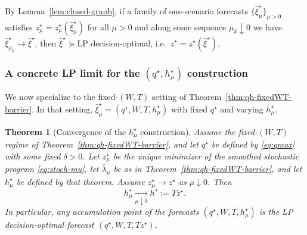 \documentclass[11pt]{article}
\theoremstyle{plain}
\newtheorem{theorem}{Theorem}[section]
\theoremstyle{definition}
\theoremstyle{remark}
\begin{document}
By Lemma~\ref{lem:closed-graph}, if a family of one-scenario forecasts $\{\hat\xi_\mu^\star\}_{\mu>0}$ satisfies
$z_\mu^\star = z_\mu^\star(\hat\xi_\mu^\star)$ for all $\mu>0$ and along some sequence $\mu_k\downarrow 0$ we have
$\hat\xi_{\mu_k}^\star\to \hat\xi^\star$, then $\hat\xi^\star$ is LP
decision-optimal, i.e.\ $z^\star = z^\star(\hat\xi^\star)$.

\subsubsection[A concrete LP limit for the (q*, h mu*) construction]{A concrete LP limit for the $(q^\star,h_\mu^\star)$ construction}\label{subsec:qh-limit}

We now specialize to the fixed-$(W,T)$ setting of Theorem~\ref{thm:qh-fixedWT-barrier}.
In that setting, $\hat\xi_\mu^\star=(q^\star,W,T,h_\mu^\star)$ with fixed $q^\star$ and varying $h_\mu^\star$.

\begin{theorem}[Convergence of the $h_\mu^\star$ construction]\label{thm:hmu-converges}
Assume the fixed-$(W,T)$ regime of Theorem~\ref{thm:qh-fixedWT-barrier}, and let $q^\star$ be
defined by \eqref{eq:qmax} with some fixed $\delta>0$. Let $z_\mu^\star$ be the unique minimizer
of the smoothed stochastic program \eqref{eq:stoch-mu}, let $\bar\lambda_\mu$ be as in Theorem~\ref{thm:qh-fixedWT-barrier},
and let $h_\mu^\star$ be defined by that theorem. Assume $z_\mu^\star\to z^\star$ as $\mu\downarrow 0$.
Then
\[
h_\mu^\star \xrightarrow[\mu\downarrow 0]{} h^\star:=Tz^\star.
\]
In particular, any accumulation point of the forecasts $(q^\star,W,T,h_\mu^\star)$ is the LP decision-optimal forecast
$(q^\star,W,T,Tz^\star)$.
\end{theorem}
\end{document}
